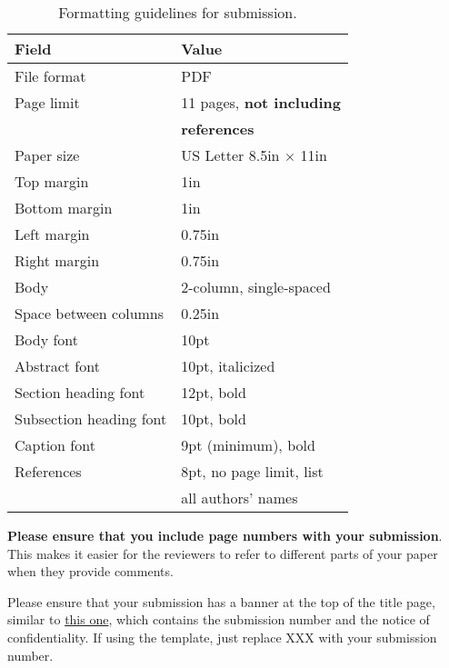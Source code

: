 \documentclass{sig-alternate}
\begin{document}
\begin{scriptsize}
\begin{table}[h!]
  \centering
  \begin{tabular}{|l|l|}
    \hline
    \textbf{Field} & \textbf{Value}\\
    \hline
    \hline
    File format & PDF \\
    \hline
    Page limit & 11 pages, {\bf not including}\\
               & {\bf references}\\
    \hline
    Paper size & US Letter 8.5in $\times$ 11in\\
    \hline
    Top margin & 1in\\
    \hline
    Bottom margin & 1in\\
    \hline
    Left margin & 0.75in\\
    \hline
    Right margin & 0.75in\\
    \hline
    Body & 2-column, single-spaced\\
    \hline
    Space between columns & 0.25in\\
    \hline
    Body font & 10pt\\
    \hline
    Abstract font & 10pt, italicized\\
    \hline
    Section heading font & 12pt, bold\\
    \hline
    Subsection heading font & 10pt, bold\\
    \hline
    Caption font & 9pt (minimum), bold\\
    \hline
    References & 8pt, no page limit, list \\
               & all authors' names\\
    \hline
  \end{tabular}
  \caption{Formatting guidelines for submission. }
  \label{table:formatting}
\end{table}
\end{scriptsize}

\textbf{Please ensure that you include page numbers with your
submission}. This makes it easier for the reviewers to refer to different
parts of your paper when they provide comments.

Please ensure that your submission has a banner at the top of the
title page, similar to
\href{http://www.microarch.org/micro48/samplepaper.pdf}{this one},
which contains the submission number and the notice of
confidentiality.  If using the template, just replace XXX with your
submission number.
\end{document}

